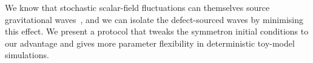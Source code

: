 We know that stochastic scalar-field fluctuations can themselves source gravitational waves~\citep{kawasakiStudyGravitationalRadiation2011}, and we can isolate the defect-sourced waves by minimising this effect. We present a protocol that tweaks the symmetron initial conditions to our advantage and gives more parameter flexibility in deterministic toy-model simulations.


















